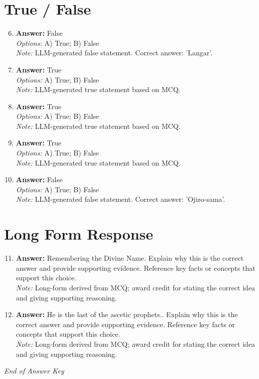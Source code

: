 \documentclass[12pt]{article}
\begin{document}
\section*{True / False}
\begin{enumerate}[label=\arabic*.]
\setcounter{enumi}{5}
\item \textbf{Answer:} False
\\ \textit{Options:} A) True; B) False
\\ \textit{Note:} LLM-generated false statement. Correct answer: 'Langar'.
\item \textbf{Answer:} True
\\ \textit{Options:} A) True; B) False
\\ \textit{Note:} LLM-generated true statement based on MCQ.
\item \textbf{Answer:} True
\\ \textit{Options:} A) True; B) False
\\ \textit{Note:} LLM-generated true statement based on MCQ.
\item \textbf{Answer:} True
\\ \textit{Options:} A) True; B) False
\\ \textit{Note:} LLM-generated true statement based on MCQ.
\item \textbf{Answer:} False
\\ \textit{Options:} A) True; B) False
\\ \textit{Note:} LLM-generated false statement. Correct answer: 'Ojizo-sama'.
\end{enumerate}

\section*{Long Form Response}
\begin{enumerate}[label=\arabic*.]
\setcounter{enumi}{10}
\item \textbf{Answer:} Remembering the Divine Name. Explain why this is the correct answer and provide supporting evidence. Reference key facts or concepts that support this choice.
\\ \textit{Note:} Long-form derived from MCQ; award credit for stating the correct idea and giving supporting reasoning.
\item \textbf{Answer:} He is the last of the ascetic prophets.. Explain why this is the correct answer and provide supporting evidence. Reference key facts or concepts that support this choice.
\\ \textit{Note:} Long-form derived from MCQ; award credit for stating the correct idea and giving supporting reasoning.
\end{enumerate}

\vfill
\noindent\textit{End of Answer Key}
\end{document}
